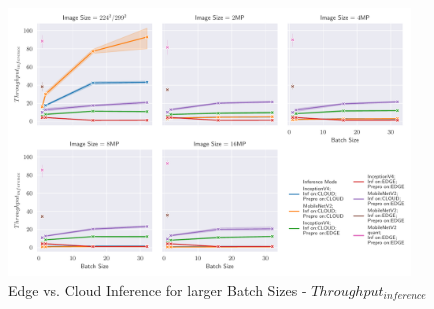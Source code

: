 \begin{figure}[H]
\centering
\includegraphics[width=0.95\textwidth]{./Bilder/single_plots/batch_size_plots/Effects_of_Batch_size_Inference_Throughput.pdf}
\caption{Edge vs. Cloud Inference for larger Batch Sizes -  $Throughput_{inference}$}
\label{fig:BatchSizeInferenceThroughput}
\end{figure}






\endinput 
